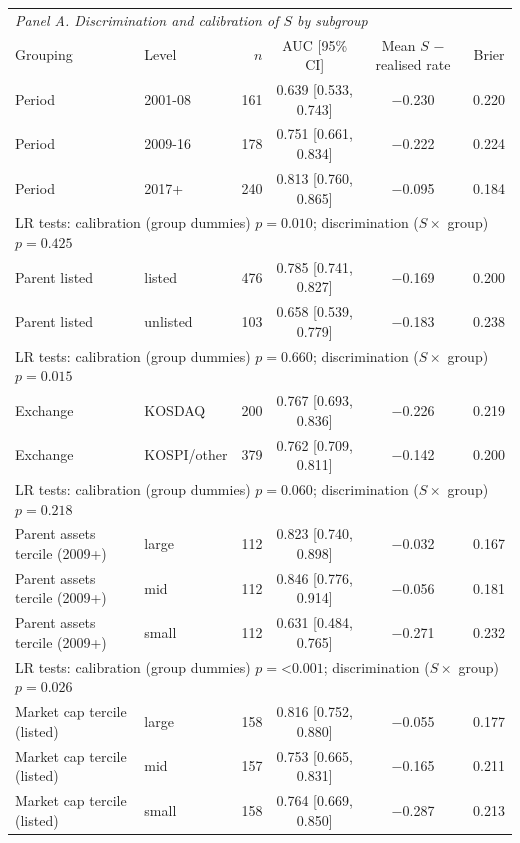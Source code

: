 \begin{tabular}{llrccc}
\toprule
\multicolumn{6}{l}{\emph{Panel A. Discrimination and calibration of $S$ by subgroup}} \\
Grouping & Level & $n$ & AUC [95\% CI] & Mean $S$ $-$ realised rate & Brier \\
\midrule
Period & 2001-08 & 161 & 0.639 [0.533, 0.743] & $-$0.230 & 0.220 \\
Period & 2009-16 & 178 & 0.751 [0.661, 0.834] & $-$0.222 & 0.224 \\
Period & 2017+ & 240 & 0.813 [0.760, 0.865] & $-$0.095 & 0.184 \\
\multicolumn{6}{l}{\quad LR tests: calibration (group dummies) $p = 0.010$; discrimination ($S \times$ group) $p = 0.425$} \\
Parent listed & listed & 476 & 0.785 [0.741, 0.827] & $-$0.169 & 0.200 \\
Parent listed & unlisted & 103 & 0.658 [0.539, 0.779] & $-$0.183 & 0.238 \\
\multicolumn{6}{l}{\quad LR tests: calibration (group dummies) $p = 0.660$; discrimination ($S \times$ group) $p = 0.015$} \\
Exchange & KOSDAQ & 200 & 0.767 [0.693, 0.836] & $-$0.226 & 0.219 \\
Exchange & KOSPI/other & 379 & 0.762 [0.709, 0.811] & $-$0.142 & 0.200 \\
\multicolumn{6}{l}{\quad LR tests: calibration (group dummies) $p = 0.060$; discrimination ($S \times$ group) $p = 0.218$} \\
Parent assets tercile (2009+) & large & 112 & 0.823 [0.740, 0.898] & $-$0.032 & 0.167 \\
Parent assets tercile (2009+) & mid & 112 & 0.846 [0.776, 0.914] & $-$0.056 & 0.181 \\
Parent assets tercile (2009+) & small & 112 & 0.631 [0.484, 0.765] & $-$0.271 & 0.232 \\
\multicolumn{6}{l}{\quad LR tests: calibration (group dummies) $p = $<$0.001$; discrimination ($S \times$ group) $p = 0.026$} \\
Market cap tercile (listed) & large & 158 & 0.816 [0.752, 0.880] & $-$0.055 & 0.177 \\
Market cap tercile (listed) & mid & 157 & 0.753 [0.665, 0.831] & $-$0.165 & 0.211 \\
Market cap tercile (listed) & small & 158 & 0.764 [0.669, 0.850] & $-$0.287 & 0.213 \\

\end{tabular}
